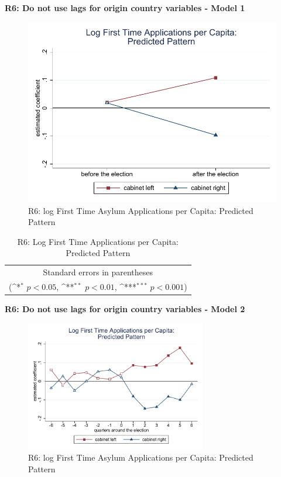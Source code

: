 \documentclass[10pt,a4paper]{scrartcl}
\begin{document}
\clearpage
\textbf{R6: Do not use lags for origin country variables - Model 1}
\begin{figure}[!ht]
	\centering
	\includegraphics[width=1\textwidth]{figures_edited/app_graph1_R6.pdf}
	\caption{R6: log First Time Asylum Applications per Capita: Predicted Pattern}
\end{figure}

\begin{table}[!ht]\centering
	\renewcommand{\arraystretch}{1.25}
	\def\sym#1{\ifmmode^{#1}\else\(^{#1}\)\fi}
	\caption{R6: Log First Time Applications per Capita: Predicted Pattern}
	\begin{tabular}{l*{2}{c}}
		\hline\hline
		
		\hline\hline
		\multicolumn{3}{c}{\footnotesize Standard errors in parentheses} \\
		\multicolumn{3}{c}{\footnotesize (\sym{*} \(p<0.05\), \sym{**} \(p<0.01\), \sym{***} \(p<0.001\))}\\
	\end{tabular}
\end{table}

\clearpage
\textbf{R6: Do not use lags for origin country variables - Model 2}
\begin{figure}[!ht]
	\centering
	\includegraphics[width=0.7\textwidth]{figures_edited/app_graph2_R6.pdf}
	\caption{R6: log First Time Asylum Applications per Capita: Predicted Pattern}
\end{figure}
\end{document}
